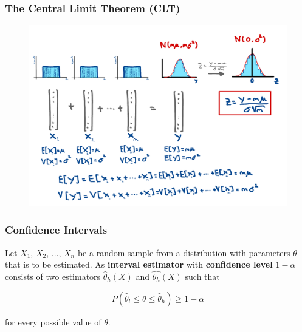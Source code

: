 \begin{frame}
    \frametitle{The Central Limit Theorem (CLT)}

    \begin{figure}
        \centering
        \includegraphics[width=1\textwidth]{slides/figures/clt_examples.pdf}
    \end{figure}

\end{frame}



\begin{frame}
    \frametitle{Confidence Intervals}
    \begin{definition}
        Let $X_1$, $X_2$, ..., $X_n$ be a random sample from a distribution with parameters $\theta$ that 
        is to be estimated. As \textbf{interval estimator} with \textbf{confidence level} $1-\alpha$
        consists of two estimators $\hat{\theta}_h(X)$ and $\hat{\theta_h}(X)$ such that

        $$P(\hat{\theta}_l \leq \theta \leq \hat{\theta}_h ) \geq 1-\alpha$$

        for every possible value of $\theta$.

    \end{definition}


\end{frame}




